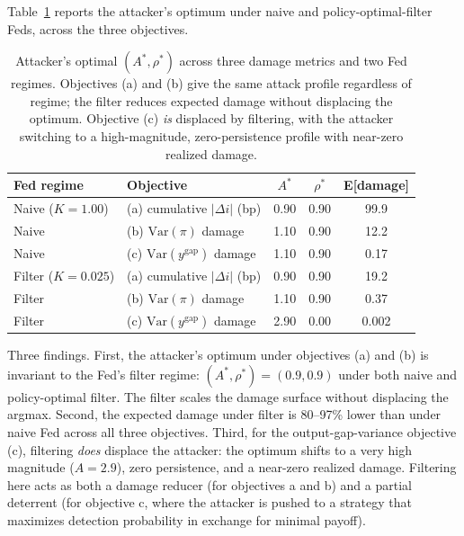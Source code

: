 \documentclass[12pt]{article}
\begin{document}
Table~\ref{tab:attacker} reports the attacker's optimum under naive and policy-optimal-filter Feds, across the three objectives.

\begin{table}[h]
\centering
\small
\begin{tabular}{llccc}
\toprule
Fed regime & Objective & \(A^*\) & \(\rho^*\) & E[damage] \\
\midrule
Naive (\(K = 1.00\)) & (a) cumulative \(|\Delta i|\) (bp) & 0.90 & 0.90 & 99.9 \\
Naive                & (b) \(\mathrm{Var}(\pi)\) damage    & 1.10 & 0.90 & 12.2 \\
Naive                & (c) \(\mathrm{Var}(y^{\text{gap}})\) damage & 1.10 & 0.90 & 0.17 \\
\midrule
Filter (\(K = 0.025\)) & (a) cumulative \(|\Delta i|\) (bp) & 0.90 & 0.90 & 19.2 \\
Filter                 & (b) \(\mathrm{Var}(\pi)\) damage    & 1.10 & 0.90 & 0.37 \\
Filter                 & (c) \(\mathrm{Var}(y^{\text{gap}})\) damage & 2.90 & 0.00 & 0.002 \\
\bottomrule
\end{tabular}
\caption{Attacker's optimal \((A^*, \rho^*)\) across three damage metrics and two Fed regimes. Objectives (a) and (b) give the same attack profile regardless of regime; the filter reduces expected damage without displacing the optimum. Objective (c) \emph{is} displaced by filtering, with the attacker switching to a high-magnitude, zero-persistence profile with near-zero realized damage.}
\label{tab:attacker}
\end{table}

Three findings. First, the attacker's optimum under objectives (a) and (b) is invariant to the Fed's filter regime: \((A^*, \rho^*) = (0.9, 0.9)\) under both naive and policy-optimal filter. The filter scales the damage surface without displacing the argmax. Second, the expected damage under filter is 80--97\% lower than under naive Fed across all three objectives. Third, for the output-gap-variance objective (c), filtering \emph{does} displace the attacker: the optimum shifts to a very high magnitude (\(A = 2.9\)), zero persistence, and a near-zero realized damage. Filtering here acts as both a damage reducer (for objectives a and b) and a partial deterrent (for objective c, where the attacker is pushed to a strategy that maximizes detection probability in exchange for minimal payoff).
\end{document}
